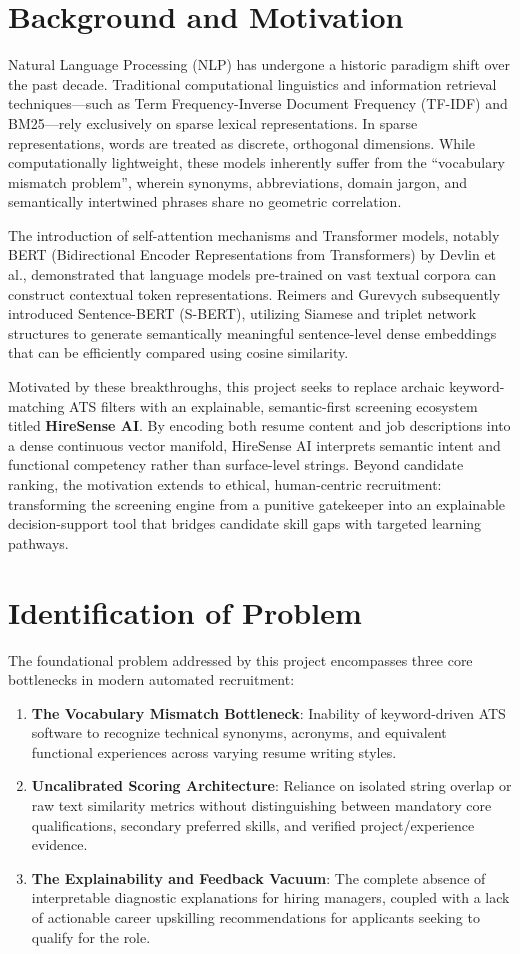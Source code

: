 \documentclass[12pt,a4paper]{report}
\begin{document}
\section{Background and Motivation}
Natural Language Processing (NLP) has undergone a historic paradigm shift over the past decade. Traditional computational linguistics and information retrieval techniques—such as Term Frequency-Inverse Document Frequency (TF-IDF) and BM25—rely exclusively on sparse lexical representations. In sparse representations, words are treated as discrete, orthogonal dimensions. While computationally lightweight, these models inherently suffer from the ``vocabulary mismatch problem'', wherein synonyms, abbreviations, domain jargon, and semantically intertwined phrases share no geometric correlation.

The introduction of self-attention mechanisms and Transformer models, notably BERT (Bidirectional Encoder Representations from Transformers) by Devlin et al., demonstrated that language models pre-trained on vast textual corpora can construct contextual token representations. Reimers and Gurevych subsequently introduced Sentence-BERT (S-BERT), utilizing Siamese and triplet network structures to generate semantically meaningful sentence-level dense embeddings that can be efficiently compared using cosine similarity.

Motivated by these breakthroughs, this project seeks to replace archaic keyword-matching ATS filters with an explainable, semantic-first screening ecosystem titled \textbf{HireSense AI}. By encoding both resume content and job descriptions into a dense continuous vector manifold, HireSense AI interprets semantic intent and functional competency rather than surface-level strings. Beyond candidate ranking, the motivation extends to ethical, human-centric recruitment: transforming the screening engine from a punitive gatekeeper into an explainable decision-support tool that bridges candidate skill gaps with targeted learning pathways.

\section{Identification of Problem}
The foundational problem addressed by this project encompasses three core bottlenecks in modern automated recruitment:
\begin{enumerate}
    \item \textbf{The Vocabulary Mismatch Bottleneck}: Inability of keyword-driven ATS software to recognize technical synonyms, acronyms, and equivalent functional experiences across varying resume writing styles.
    \item \textbf{Uncalibrated Scoring Architecture}: Reliance on isolated string overlap or raw text similarity metrics without distinguishing between mandatory core qualifications, secondary preferred skills, and verified project/experience evidence.
    \item \textbf{The Explainability and Feedback Vacuum}: The complete absence of interpretable diagnostic explanations for hiring managers, coupled with a lack of actionable career upskilling recommendations for applicants seeking to qualify for the role.
\end{enumerate}
\end{document}
